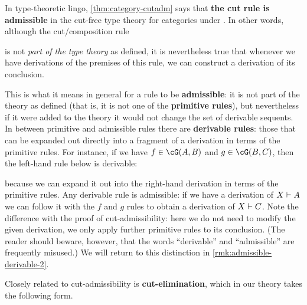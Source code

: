 In type-theoretic lingo, \cref{thm:category-cutadm} says that \textbf{the cut rule is admissible} in the cut-free type theory for categories under \cG.
In other words, although the cut/composition rule
\begin{mathpar}
\end{mathpar}
is not \emph{part of the type theory} as defined, it is nevertheless true that whenever we have derivations of the premises of this rule, we can construct a derivation of its conclusion.

\begin{rmk}\label{rmk:admissible-derivable-1}
  This is what it means in general for a rule to be \textbf{admissible}: it is not part of the theory as defined (that is, it is not one of the \textbf{primitive rules}), but nevertheless if it were added to the theory it would not change the set of derivable sequents.
  In between primitive and admissible rules there are \textbf{derivable rules}: those that can be expanded out directly into a fragment of a derivation in terms of the primitive rules.
  For instance, if we have $f\in\cG(A,B)$ and $g\in \cG(B,C)$, then the left-hand rule below is derivable:
  because we can expand it out into the right-hand derivation in terms of the primitive rules.
  Any derivable rule is admissible: if we have a derivation of $X\types A$ we can follow it with the $f$ and $g$ rules to obtain a derivation of $X\types C$.
  Note the difference with the proof of cut-admissibility: here we do not need to modify the given derivation, we only apply further primitive rules to its conclusion.
  (The reader should beware, however, that the words ``derivable'' and ``admissible'' are frequently misused.)
  We will return to this distinction in \cref{rmk:admissible-derivable-2}.
\end{rmk}

Closely related to cut-admissibility is \textbf{cut-elimination}, which in our theory takes the following form.

